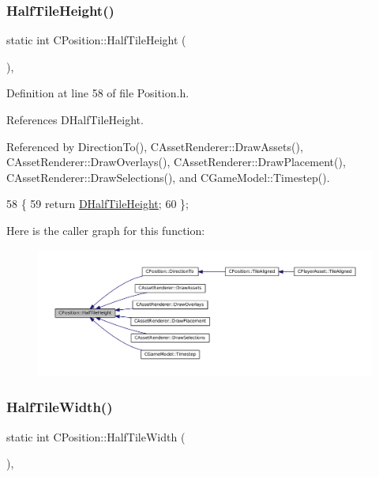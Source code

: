\subsubsection{\texorpdfstring{Half\+Tile\+Height()}{HalfTileHeight()}}
{\footnotesize\ttfamily static int C\+Position\+::\+Half\+Tile\+Height (\begin{DoxyParamCaption}{ }\end{DoxyParamCaption})\hspace{0.3cm}{\ttfamily [inline]}, {\ttfamily [static]}}



Definition at line 58 of file Position.\+h.



References D\+Half\+Tile\+Height.



Referenced by Direction\+To(), C\+Asset\+Renderer\+::\+Draw\+Assets(), C\+Asset\+Renderer\+::\+Draw\+Overlays(), C\+Asset\+Renderer\+::\+Draw\+Placement(), C\+Asset\+Renderer\+::\+Draw\+Selections(), and C\+Game\+Model\+::\+Timestep().


\begin{DoxyCode}
58                                    \{
59             \textcolor{keywordflow}{return} \hyperlink{classCPosition_a1e0af68f7690b3cfc14687cf7fbe7ade}{DHalfTileHeight};  
60         \};
\end{DoxyCode}
Here is the caller graph for this function\+:\nopagebreak
\begin{figure}[H]
\begin{center}
\leavevmode
\includegraphics[width=350pt]{classCPosition_a5e371060b1aa0d3d3c5df1e353e0e5fd_icgraph}
\end{center}
\end{figure}
\hypertarget{classCPosition_a4b799a0fb78ddd8bbd8548980e2458af}{}\label{classCPosition_a4b799a0fb78ddd8bbd8548980e2458af} 
\subsubsection{\texorpdfstring{Half\+Tile\+Width()}{HalfTileWidth()}}
{\footnotesize\ttfamily static int C\+Position\+::\+Half\+Tile\+Width (\begin{DoxyParamCaption}{ }\end{DoxyParamCaption})\hspace{0.3cm}{\ttfamily [inline]}, {\ttfamily [static]}}



